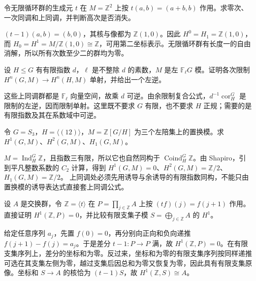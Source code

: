 \begin{exercise}\label{b4:ex:11-unipotent-cyclic}
令无限循环群的生成元 \(t\) 在 \(M=\mathbb Z^2\) 上按 \(t(a,b)=(a+b,b)\) 作用。求零次、一次同调和上同调，并判断高次是否消失。
\end{exercise}
\begin{solution}
\((t-1)(a,b)=(b,0)\)，其核与像都为 \(\mathbb Z(1,0)\)。因此 \(H^0=H_1=\mathbb Z(1,0)\)，而 \(H_0=H^1=M/\mathbb Z(1,0)\cong\mathbb Z\)，可用第二坐标表示。无限循环群有长度一的自由消解，所以所有次数至少二的群均为零。
\end{solution}

\begin{exercise}\label{b4:ex:11-restriction-prime-index}
设 \(H\le G\) 有有限指数 \(d\)，\(\ell\) 是不整除 \(d\) 的素数，\(M\) 是左 \(\mathbb F_\ell G\) 模。证明各次限制 \(H^n(G,M)\to H^n(H,M)\) 单射，并给出一个左逆。
\end{exercise}
\begin{solution}
这些上同调群都是 \(\mathbb F_\ell\) 向量空间，故乘 \(d\) 可逆。由余限制复合公式，\(d^{-1}\operatorname{cor}_H^G\) 是限制的左逆，因而限制单射。这里既不要求 \(G\) 有限，也不要求 \(H\) 正规；需要的是有限指数及其在系数域中可逆。
\end{solution}

\begin{exercise}\label{b4:ex:11-shapiro-permutation}
令 \(G=S_3\)，\(H=\langle(12)\rangle\)，\(M=\mathbb Z[G/H]\) 为三个左陪集上的置换模。求 \(H^1(G,M)\)、\(H^2(G,M)\)、\(H_1(G,M)\)。
\end{exercise}
\begin{solution}
\(M=\operatorname{Ind}_H^G\mathbb Z\)，且指数三有限，所以它也自然同构于 \(\operatorname{Coind}_H^G\mathbb Z\)。由 Shapiro，引到平凡整数系数的 \(C_2\) 计算，得到
\(H^1(G,M)=0\)、\(H^2(G,M)=\mathbb Z/2\)、\(H_1(G,M)=\mathbb Z/2\)。
上同调处必须先用诱导与余诱导的有限指数同构，不能只由置换模的诱导表达式直接套上同调公式。
\end{solution}

\begin{exercise}\label{b4:ex:11-sequence-difference}
设 \(A\) 是交换群，令 \(\mathbb Z=\langle t\rangle\) 在 \(P=\prod_{j\in\mathbb Z}A\) 上按 \((tf)(j)=f(j+1)\) 作用。直接证明 \(H^1(\mathbb Z,P)=0\)，并比较有限支集子模 \(S=\bigoplus_{j\in\mathbb Z}A\) 的 \(H^1\)。
\end{exercise}
\begin{solution}
给定任意序列 \(a_j\)，先置 \(f(0)=0\)，再分别向正向和负向递推 \(f(j+1)-f(j)=a_j\)。于是差分 \(t-1:P\to P\) 满，故 \(H^1(\mathbb Z,P)=0\)。在有限支集序列上，差分的坐标和为零。反过来，坐标和为零的有限支集序列按同样递推可选在其支集左侧为零，越过支集后因总和为零又恢复为零，因此具有有限支集原像。坐标和 \(S\to A\) 的核恰为 \((t-1)S\)，故 \(H^1(\mathbb Z,S)\cong A\)。
\end{solution}

